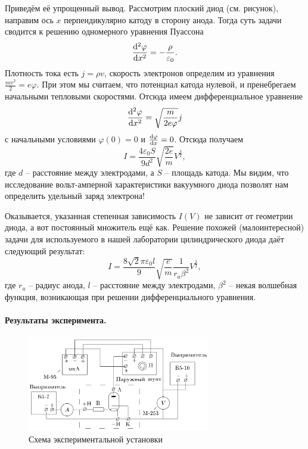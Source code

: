 \documentclass{../lab_class}
\begin{document}
Приведём её упрощенный вывод. Рассмотрим плоский диод (см. рисунок), направим ось $x$ перпендикулярно катоду в сторону анода. Тогда суть задачи сводится к решению одномерного уравнения Пуассона
\begin{equation}
	\dv[2]{\varphi}{x} = - \frac{\rho}{\varepsilon_0}.
\end{equation}
Плотность тока есть $j = \rho v$, скорость электронов определим из уравнения $\frac{m v^2}{2} = e \varphi$. При этом мы считаем, что потенциал катода нулевой, и пренебрегаем начальными тепловыми скоростями. Отсюда имеем дифференциальное уравнение
\begin{equation*}
	\dv[2]{\varphi}{x} = \sqrt{\frac{m}{2e\varphi}} j
\end{equation*}
с начальными условиями $\varphi(0) = 0$ и $\dv{\varphi}{x} (0) = 0$. Отсюда получаем
\begin{equation}
	I = \frac{4 \varepsilon_0 S}{9 d^2} \sqrt{\frac{2e}{m}} V^{\frac{3}{2}},
\end{equation}
где $d$ -- расстояние между электродами, а $S$ -- площадь катода. Мы видим, что исследование вольт-амперной характеристики вакуумного диода позволят нам определить удельный заряд электрона!

Оказывается, указанная степенная зависимость $I(V)$ не зависит от геометрии диода, а вот постоянный множитель ещё как. Решение похожей (малоинтересной) задачи для используемого в нашей лаборатории цилиндрического диода даёт следующий результат:
\begin{equation}\label{eq:main_f}
	I = \frac{8\sqrt{2}\pi\varepsilon_0 l}{9} \sqrt{\frac{e}{m}} \frac{1}{r_a \beta^2} V^{\frac{3}{2}},
\end{equation}
где $r_a$ -- радиус анода, $l$ -- расстояние между электродами, $\beta^2$ -- некая волшебная функция, возникающая при решении дифференциального уравнения. 

\paragraph{Результаты эксперимента.}

\begin{figure}
\centering
\includegraphics[width=8cm]{lab_scheme.png}
\caption{Схема экспериментальной установки}
\end{figure}
\end{document}
